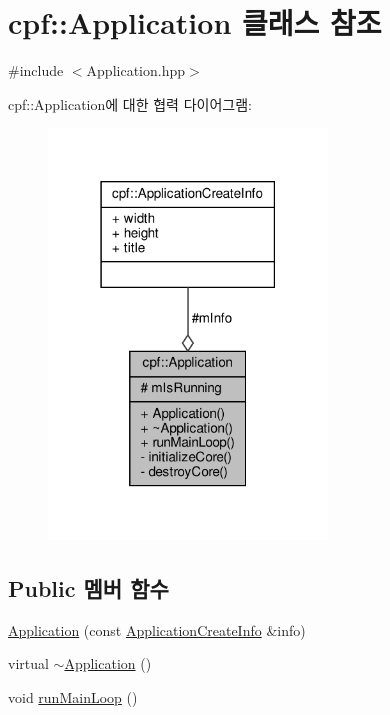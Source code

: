 \hypertarget{classcpf_1_1_application}{}\section{cpf\+:\+:Application 클래스 참조}
\label{classcpf_1_1_application}


{\ttfamily \#include $<$Application.\+hpp$>$}



cpf\+:\+:Application에 대한 협력 다이어그램\+:\nopagebreak
\begin{figure}[H]
\begin{center}
\leavevmode
\includegraphics[width=210pt]{classcpf_1_1_application__coll__graph}
\end{center}
\end{figure}
\subsection*{Public 멤버 함수}
\begin{DoxyCompactItemize}
\item 
\hyperlink{classcpf_1_1_application_a82aea6d89660d4ae9898a437f96d2e42}{Application} (const \hyperlink{structcpf_1_1_application_create_info}{Application\+Create\+Info} \&info)
\item 
virtual \hyperlink{classcpf_1_1_application_ad018a98c533cbf877ae11a05b329c4a2}{$\sim$\+Application} ()
\item 
void \hyperlink{classcpf_1_1_application_a52e76d84434e072ad6dafdf7a0f4fd59}{run\+Main\+Loop} ()
\end{DoxyCompactItemize}
